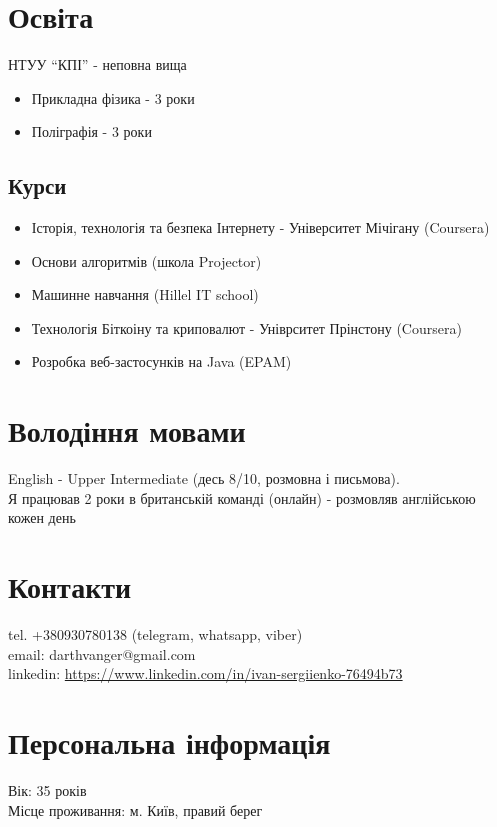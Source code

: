 \documentclass[a4paper, 14pt]{article}
\begin{document}
\section{Освіта}
  НТУУ ``КПІ'' - неповна вища
  \begin{itemize}
    \item Прикладна фізика - 3 роки \\
    \item Поліграфія - 3 роки
  \end{itemize}

  \subsection{Курси}
  \begin{itemize}
    \item Історія, технологія та безпека Інтернету - Університет Мічігану (Coursera) \\
    \item Основи алгоритмів (школа Projector) \\
    \item Машинне навчання (Hillel IT school) \\
    \item Технологія Біткоіну та криповалют - Уніврситет Прінстону (Coursera) \\
    \item Розробка веб-застосунків на Java (EPAM)
  \end{itemize}

\section{Володіння мовами}
	English - Upper Intermediate (десь 8/10, розмовна і письмова). \\
  Я працював 2 роки в британській команді (онлайн) - розмовляв англійською кожен день

\section{Контакти}
	tel. +380930780138 (telegram, whatsapp, viber) \\
	email: darthvanger@gmail.com \\
  linkedin: \url{https://www.linkedin.com/in/ivan-sergiienko-76494b73}

\section{Персональна інформація}
	Вік: 35 років \\
  Місце проживання: м. Київ, правий берег
\end{document}
